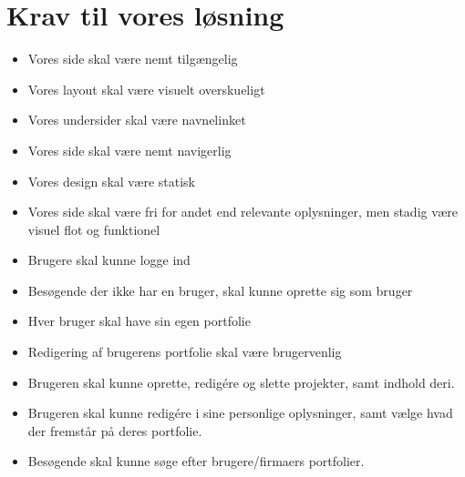\documentclass[a4paper,titlepage,fleqn,12pt]{article}
\begin{document}
\section{Krav til vores løsning}
\begin{itemize}
	\item Vores side skal være nemt tilgængelig
	\item Vores layout skal være visuelt overskueligt
	\item Vores undersider skal være navnelinket
	\item Vores side skal være nemt navigerlig
	\item Vores design skal være statisk
	\item Vores side skal være fri for andet end relevante oplysninger, men stadig være visuel flot og funktionel
	\item Brugere skal kunne logge ind
	\item Besøgende der ikke har en bruger, skal kunne oprette sig som bruger
	\item Hver bruger skal have sin egen portfolie
	\item Redigering af brugerens portfolie skal være brugervenlig
	\item Brugeren skal kunne oprette, redigére og slette projekter, samt indhold deri.
	\item Brugeren skal kunne redigére i sine personlige oplysninger, samt vælge hvad der fremstår på deres portfolie.
	\item Besøgende skal kunne søge efter brugere/firmaers portfolier.
\end{itemize}
\end{document}
